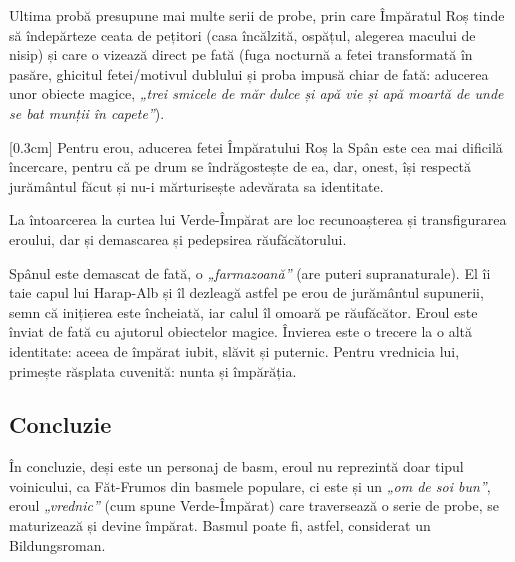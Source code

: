Ultima probă presupune mai multe serii de probe, prin care Împăratul Roș tinde să îndepărteze ceata de pețitori (casa încălzită, ospățul, alegerea macului de nisip) și care o vizează direct pe fată (fuga nocturnă a fetei transformată în pasăre, ghicitul fetei/motivul dublului și proba impusă chiar de fată: aducerea unor obiecte magice, \textit{„trei smicele de măr dulce și apă vie și apă moartă de unde se bat munții în capete”}).

[0.3cm]
Pentru erou, aducerea fetei Împăratului Roș la Spân este cea mai dificilă încercare, pentru că pe drum se îndrăgostește de ea, dar, onest, își respectă jurământul făcut și nu-i mărturisește adevărata sa identitate.

La întoarcerea la curtea lui Verde-Împărat are loc recunoașterea și transfigurarea eroului, dar și demascarea și pedepsirea răufăcătorului.

Spânul este demascat de fată, o \textit{„farmazoană”} (are puteri supranaturale). El îi taie capul lui Harap-Alb și îl dezleagă astfel pe erou de jurământul supunerii, semn că inițierea este încheiată, iar calul îl omoară pe răufăcător. Eroul este înviat de fată cu ajutorul obiectelor magice. Învierea este o trecere la o altă identitate: aceea de împărat iubit, slăvit și puternic. Pentru vrednicia lui, primește răsplata cuvenită: nunta și împărăția.


\subsection{Concluzie}

În concluzie, deși este un personaj de basm, eroul nu reprezintă doar tipul voinicului, ca Făt-Frumos din basmele populare, ci este și un \textit{„om de soi bun”}, eroul \textit{„vrednic”} (cum spune Verde-Împărat) care traversează o serie de probe, se maturizează și devine împărat. Basmul poate fi, astfel, considerat un Bildungsroman.

